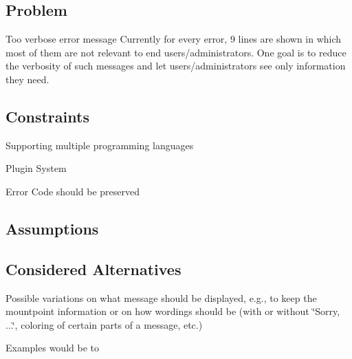 \subsection*{Problem}

Too verbose error message Currently for every error, 9 lines are shown in which most of them are not relevant to end users/administrators. One goal is to reduce the verbosity of such messages and let users/administrators see only information they need.

\subsection*{Constraints}


\begin{DoxyItemize}
\item Supporting multiple programming languages
\item Plugin System
\item Error Code should be preserved
\end{DoxyItemize}

\subsection*{Assumptions}

\subsection*{Considered Alternatives}

Possible variations on what message should be displayed, e.\+g., to keep the mountpoint information or on how wordings should be (with or without \char`\"{}\+Sorry, ...\char`\"{}, coloring of certain parts of a message, etc.)

Examples would be to


